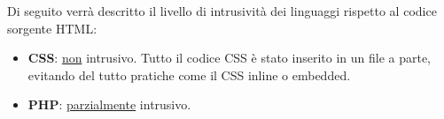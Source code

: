 Di seguito verrà descritto il livello di intrusività dei linguaggi rispetto al codice sorgente HTML:
\begin{itemize}
    \item \textbf{CSS}: \underline{non} intrusivo. Tutto il codice CSS è stato inserito in un file a parte, evitando del tutto pratiche come il
    CSS inline o embedded.
    \item \textbf{PHP}: \underline{parzialmente} intrusivo. 
\end{itemize}